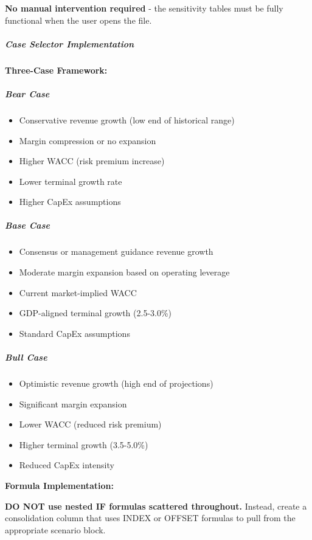 \documentclass[11pt]{article}
\begin{document}
\textbf{No manual intervention required} - the sensitivity tables must be fully functional when the user opens the file.


\subparagraph{Case Selector Implementation}\mbox{}\par

\textbf{Three-Case Framework:}


\subparagraph{Bear Case}\mbox{}\par
\begin{itemize}[leftmargin=*,itemsep=2pt,topsep=2pt]
\item {} Conservative revenue growth (low end of historical range)
\item {} Margin compression or no expansion
\item {} Higher WACC (risk premium increase)
\item {} Lower terminal growth rate
\item {} Higher CapEx assumptions
\end{itemize}

\subparagraph{Base Case}\mbox{}\par
\begin{itemize}[leftmargin=*,itemsep=2pt,topsep=2pt]
\item {} Consensus or management guidance revenue growth
\item {} Moderate margin expansion based on operating leverage
\item {} Current market-implied WACC
\item {} GDP-aligned terminal growth (2.5-3.0\%)
\item {} Standard CapEx assumptions
\end{itemize}

\subparagraph{Bull Case}\mbox{}\par
\begin{itemize}[leftmargin=*,itemsep=2pt,topsep=2pt]
\item {} Optimistic revenue growth (high end of projections)
\item {} Significant margin expansion
\item {} Lower WACC (reduced risk premium)
\item {} Higher terminal growth (3.5-5.0\%)
\item {} Reduced CapEx intensity
\end{itemize}

\textbf{Formula Implementation:}


\textbf{DO NOT use nested IF formulas scattered throughout.} Instead, create a consolidation column that uses INDEX or OFFSET formulas to pull from the appropriate scenario block.
\end{document}
